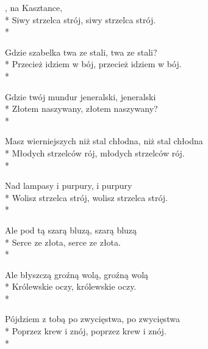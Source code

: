 
\begin{lyrics}[longestline={Masz wierniejszych niż stal chłodna, niż stal chłodna}]

, na Kasztance,\\*
Siwy strzelca strój, siwy strzelca strój.\\*

Gdzie szabelka twa ze stali, twa ze stali?\\*
Przecież idziem w bój, przecież idziem w bój.\\*

Gdzie twój mundur jeneralski, jeneralski\\*
Złotem naszywany, złotem naszywany?\\*

Masz wierniejszych niż stal chłodna, niż stal chłodna\\*
Młodych strzelców rój, młodych strzelców rój.\\*

Nad lampasy i purpury, i purpury\\*
Wolisz strzelca strój, wolisz strzelca strój.\\*

Ale pod tą szarą bluzą, szarą bluzą\\*
Serce ze złota, serce ze złota.\\*

Ale błyszczą groźną wolą, groźną wolą\\*
Królewskie oczy, królewskie oczy.\\*

Pójdziem z tobą po zwycięstwa, po zwycięstwa\\*
Poprzez krew i znój, poprzez krew i znój.\\*
\end{lyrics}



